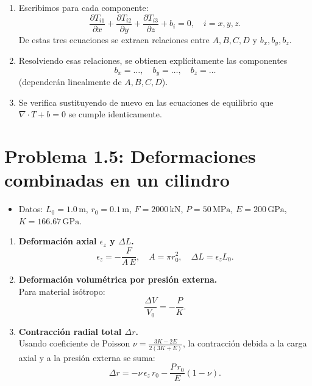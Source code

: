 \documentclass{article}
\begin{document}
\begin{enumerate}
  \item Escribimos para cada componente:
    \[
      \frac{\partial T_{i1}}{\partial x} + \frac{\partial T_{i2}}{\partial y}
      + \frac{\partial T_{i3}}{\partial z} + b_i = 0,
      \quad i=x,y,z.
    \]
    De estas tres ecuaciones se extraen relaciones entre \(A,B,C,D\) y \(b_x,b_y,b_z\).

  \item Resolviendo esas relaciones, se obtienen explícitamente las componentes
    \[
      b_x = \dots,\quad b_y = \dots,\quad b_z = \dots
    \]
    (dependerán linealmente de \(A,B,C,D\)).

  \item Se verifica sustituyendo de nuevo en las ecuaciones de equilibrio que
    \(\nabla\cdot T + b = 0\) se cumple identicamente.
\end{enumerate}

\section*{Problema 1.5: Deformaciones combinadas en un cilindro}

\begin{itemize}
  \item Datos: \(L_0=1.0\,\mathrm{m}\), \(r_0=0.1\,\mathrm{m}\), 
    \(F=2000\,\mathrm{kN}\), \(P=50\,\mathrm{MPa}\), 
    \(E=200\,\mathrm{GPa}\), \(K=166.67\,\mathrm{GPa}\).
\end{itemize}

\begin{enumerate}
  \item \textbf{Deformación axial \(\epsilon_z\) y \(\Delta L\).}\\
    \[
      \epsilon_z = -\frac{F}{A\,E},\quad A=\pi r_0^2,
      \quad \Delta L = \epsilon_z L_0.
    \]

  \item \textbf{Deformación volumétrica por presión externa.}\\
    Para material isótropo:
    \[
      \frac{\Delta V}{V_0} = -\frac{P}{K}.
    \]

  \item \textbf{Contracción radial total \(\Delta r\).}\\
    Usando coeficiente de Poisson 
    \(\nu = \tfrac{3K-2E}{2(3K+E)}\), la contracción debida a la carga axial
    y a la presión externa se suma:
    \[
      \Delta r = -\nu\,\epsilon_z\,r_0 - \frac{P\,r_0}{E}(1-\nu).
    \]
\end{enumerate}
\end{document}
